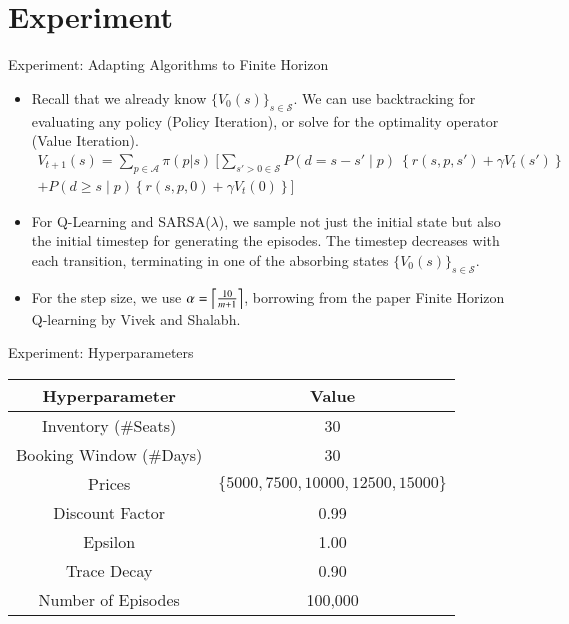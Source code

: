 \section{Experiment}

\begin{frame}{Experiment: Adapting Algorithms to Finite Horizon}
\begin{itemize}
    \item Recall that we already know $\{V_0(s)\}_{s \in \mathcal{S}}$. We can use backtracking for evaluating any policy (Policy Iteration), or solve for the optimality operator (Value Iteration).
    \begin{align*}
    V_{t + 1}(s) = \sum_{p \in \mathcal{A}} \pi(p | s) \ \biggr[
    \sum_{s' > 0 \in \mathcal{S}} P(d = s - s' \mid p) \ \left\{ r(s, p, s') + \gamma V_t(s') \right\} \\
    + P(d \geq s \mid p) \left\{ r(s, p, 0) + \gamma V_t(0) \right\} \biggr]
    \end{align*}
    \item For Q-Learning and SARSA($\lambda$), we sample not just the initial state but also the initial timestep for generating the episodes. The timestep decreases with each transition, terminating in one of the absorbing states $\{V_0(s)\}_{s \in \mathcal{S}}$.
    \item For the step size, we use $\alpha = \ceil*{\frac{10}{m + 1}}$, borrowing from the paper Finite Horizon Q-learning by Vivek and Shalabh.
\end{itemize}
\end{frame}

\begin{frame}{Experiment: Hyperparameters}
\begin{center}
\begin{tabular}{|c|c|}
    \hline
    Hyperparameter & Value \\
    \hline
    Inventory (\#Seats) & 30 \\
    Booking Window (\#Days) & 30 \\
    Prices & $\{5000, 7500, 10000, 12500, 15000\}$ \\
    Discount Factor & 0.99 \\
    Epsilon & 1.00 \\
    Trace Decay & 0.90 \\
    Number of Episodes & 100,000 \\
    \hline
\end{tabular}
\end{center}
\end{frame}

